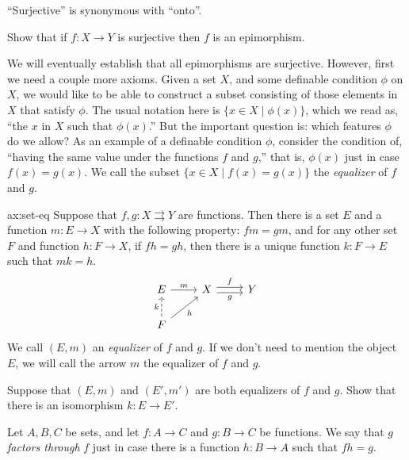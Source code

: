 \begin{note} ``Surjective'' is synonymous with ``onto''. \end{note}

\begin{exercise} Show that if $f:X\to Y$ is surjective then $f$ is an
  epimorphism. \end{exercise}

We will eventually establish that all epimorphisms are surjective.
However, first we need a couple more axioms.  Given a set $X$, and
some definable condition $\phi$ on $X$, we would like to be able to
construct a subset consisting of those elements in $X$ that satisfy
$\phi$.  The usual notation here is $\{ x\in X\mid \phi (x) \}$, which
we read as, ``the $x$ in $X$ such that $\phi (x)$.''  But the
important question is: which features $\phi$ do we allow?  As an
example of a definable condition $\phi$, consider the condition of,
``having the same value under the functions $f$ and $g$,'' that is,
$\phi (x)$ just in case $f(x)=g(x)$.  We call the subset $\{ x\in
X\mid f(x)=g(x) \}$ the \emph{equalizer} of $f$ and $g$.

\begin{axi}[Equalizers]{ax:set-eq} Suppose that
  $f,g:X\rightrightarrows Y$ are functions.  Then there is a set $E$
  and a function $m:E\to X$ with the following property: $fm=gm$, and
  for any other set $F$ and function $h:F\to X$, if $fh=gh$, then
  there is a unique function $k:F\to E$ such that $mk=h$.
\[ \begin{tikzcd}
E \arrow[r,"m"] & X \arrow[shift left,r,"f"] \arrow[shift right,r,"g"']
& Y \\
F \arrow[dashed,u,"k"] \arrow[ur,"h"'] 
\end{tikzcd} \] We call $(E,m)$ an \emph{equalizer} of $f$ and $g$.
If we don't need to mention the object $E$, we will call the arrow $m$
the equalizer of $f$ and $g$.  \label{ax:set-eq} \end{axi}

\begin{exercise} Suppose that $(E,m)$ and $(E',m')$ are both
  equalizers of $f$ and $g$.  Show that there is an isomorphism
  $k:E\to E'$.  \end{exercise}

\begin{defn} Let $A,B,C$ be sets, and let $f:A\to C$ and $g:B\to C$ be
  functions.  We say that $g$ \emph{factors through} $f$ just in case
  there is a function $h:B\to A$ such that $fh=g$. \end{defn}

